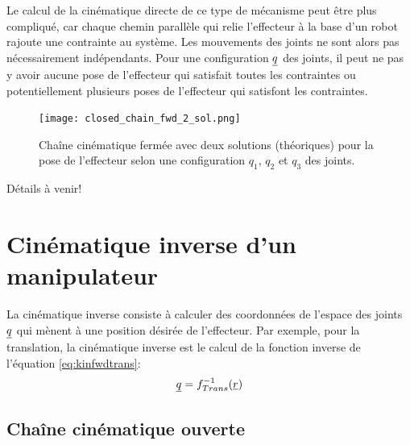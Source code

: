 Le calcul de la cinématique directe de ce type de mécanisme peut être plus compliqué, car chaque chemin parallèle qui relie l'effecteur à la base d'un robot rajoute une contrainte au système. Les mouvements des joints ne sont alors pas nécessairement indépendants. Pour une configuration $\underline{q}$ des joints, il peut ne pas y avoir aucune pose de l'effecteur qui satisfait toutes les contraintes ou potentiellement plusieurs poses de l'effecteur qui satisfont les contraintes.
\begin{figure}[H]
	\centering
	\texttt{[image: closed\_chain\_fwd\_2\_sol.png]}
	\caption{Chaîne cinématique fermée avec deux solutions (théoriques) pour la pose de l'effecteur selon une configuration $q_1$, $q_2$ et $q_3$ des joints. }
	\label{fig:closed_chain_fwd_2_sol}
\end{figure}


Détails à venir!





\newpage
\section{Cinématique inverse d'un manipulateur}
\label{sec:invkin}

La cinématique inverse consiste à calculer des coordonnées de l'espace des joints $\underline{q}$ qui mènent à une position désirée de l'effecteur. Par exemple, pour la translation, la cinématique inverse est le calcul de la fonction inverse de l'équation \eqref{eq:kinfwdtrans}:
\begin{align}
	\underline{q} = f^{-1}_{Trans}( \underline{r} )
	\label{eq:kininv}
\end{align}


\subsection{Chaîne cinématique ouverte}

